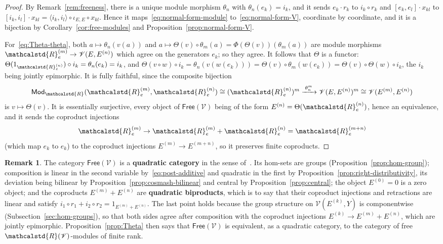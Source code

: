 \documentclass[reqno,a4paper]{amsart}
\theoremstyle{plain}
\theoremstyle{definition}
\newtheorem{remark}[subsection]{Remark}
\newcommand{\defn}{\textbf}
\newcommand{\V}{\ensuremath{\mathcal{V}}}
\newcommand{\R}{\ensuremath{\mathcalstd{R}}}
\newcommand{\Mod}{\ensuremath{\mathsf{Mod}}}
\newcommand{\Free}{\ensuremath{\mathsf{Free}}}
\renewcommand{\Re}{\ensuremath{\R_{e}}}
\newcommand{\brk}[2]{\ensuremath{[#1,#2]}}
\begin{document}
\begin{proof}
  By Remark~\ref{rem:freeness}, there is a unique module morphism \(\theta_{n}\) with \(\theta_{n}(e_{k})=i_{k}\), and it sends \(e_{k}\cdot r_{k}\) to \(i_{k}\circ r_{k}\) and \(\brk{e_{k}}{e_{l}}\cdot x_{kl}\) to \(\brk{i_{k}}{i_{l}}\cdot x_{kl}=\langle i_{k},i_{l}\rangle\circ\iota_{E,E}\circ x_{kl}\). Hence it maps~\eqref{eq:normal-form-module} to~\eqref{eq:normal-form-V}, coordinate by coordinate, and it is a bijection by Corollary~\ref{cor:free-modules} and Proposition~\ref{prop:normal-form-V}.

  For~\eqref{eq:Theta-theta}, both \(a\mapsto\theta_{n}(v(a))\) and \(a\mapsto\Theta(v)\circ\theta_{m}(a)=\Phi(\Theta(v))(\theta_{m}(a))\) are module morphisms \(\Re^{(m)}\to\V(E,E^{(n)})\) which agree on the generators \(e_{k}\); so they agree. It follows that \(\Theta\) is a functor: \(\Theta(1_{\Re^{(n)}})\circ i_{k}=\theta_{n}(e_{k})=i_{k}\), and \(\Theta(v\circ w)\circ i_{k}=\theta_{n}(v(w(e_{k})))=\Theta(v)\circ\theta_{m}(w(e_{k}))=\Theta(v)\circ\Theta(w)\circ i_{k}\), the \(i_{k}\) being jointly epimorphic. It is fully faithful, since the composite bijection
  \[
    \Mod_{\R}(\Re^{(m)},\Re^{(n)})\cong(\Re^{(n)})^{m}\xrightarrow{\;\theta_{n}^{m}\;}\V(E,E^{(n)})^{m}\cong\V(E^{(m)},E^{(n)})
  \]
  is \(v\mapsto\Theta(v)\). It is essentially surjective, every object of \(\Free(\V)\) being of the form \(E^{(n)}=\Theta(\Re^{(n)})\), hence an equivalence, and it sends the coproduct injections
  \[
    \Re^{(m)}\to\Re^{(m)}+\Re^{(n)}=\Re^{(m+n)}
  \]
  (which map \(e_{k}\) to \(e_{k}\)) to the coproduct injections \(E^{(m)}\to E^{(m+n)}\), so it preserves finite coproducts.
\end{proof}

\begin{remark}\label{rem:quadratic-category}
  The category \(\Free(\V)\) is a \defn{quadratic category} in the sense of~\cite[Definition~2.1]{BHP}. Its hom-sets are groups (Proposition~\ref{prop:hom-group}); composition is linear in the second variable by~\eqref{eq:post-additive} and quadratic in the first by Proposition~\ref{prop:right-distributivity}, its deviation being bilinear by Proposition~\ref{prop:cosmash-bilinear} and central by Proposition~\ref{prop:central}; the object \(E^{(0)}=0\) is a zero object; and the coproducts \(E^{(m)}+E^{(n)}\) are \defn{quadratic biproducts}, which is to say that their coproduct injections and retractions are linear and satisfy \(i_{1}\circ r_{1}+i_{2}\circ r_{2}=1_{E^{(m)}+E^{(n)}}\). The last point holds because the group structure on \(\V(E^{(k)},Y)\) is componentwise (Subsection~\ref{sec:hom-groups}), so that both sides agree after composition with the coproduct injections \(E^{(k)}\to E^{(m)}+E^{(n)}\), which are jointly epimorphic. Proposition~\ref{prop:Theta} then says that \(\Free(\V)\) is equivalent, as a quadratic category, to the category of free \(\R(\V)\)-modules of finite rank.
\end{remark}
\end{document}
